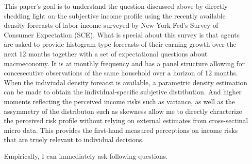 \documentclass[12pt,notitlepage,onecolumn,aps,pra]{revtex4-1}
\begin{document}
This paper's goal is to understand the question discussed above by
directly shedding light on the subjective income profile using the
recently available density forecasts of labor income surveyed by New
York Fed's Survey of Consumer Expectation (SCE). What is special about
this survey is that agents are asked to provide histogram-type forecasts
of their earning growth over the next 12 months together with a set of
expectational questions about macroeconomy. It is at monthly frequency
and has a panel structure allowing for concesecutive observations of the
same household over a horizon of 12 months. When the indiviudal density
foreacst is available, a parametric density estimation can be made to
obtain the individual-specific subjetive distribution. And higher
moments reflecting the perceived income risks such as variance, as well
as the assymmetry of the distributon such as skewness allow me to
directly chracterize the perceived risk profile without relying on
external estimates from cross-sectinal micro data. This provides the
first-hand measured perceptions on income risks that are truely relevant
to individual decisions.

Empirically, I can immediately ask following questions.
\end{document}
